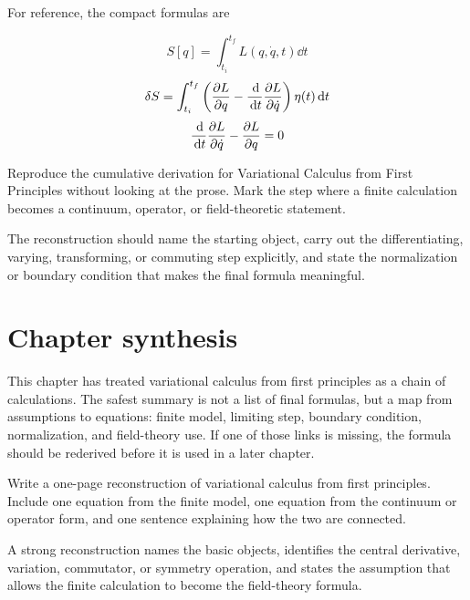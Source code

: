 For reference, the compact formulas are

\[
  S[q]=\int_{t_i}^{t_f}L(q,\dot q,t)\dd t
\]
\[
  \delta S=\int_{t_i}^{t_f}\left(\frac{\partial L}{\partial q}-\frac{\,\mathrm d}{\,\mathrm d t}\frac{\partial L}{\partial\dot q}\right)\eta(t)\,\mathrm d t
\]
\[
  \frac{\,\mathrm d}{\,\mathrm d t}\frac{\partial L}{\partial\dot q}-\frac{\partial L}{\partial q}=0
\]

\begin{exercise}
Reproduce the cumulative derivation for Variational Calculus from First Principles without looking at the prose.  Mark the step where a finite calculation becomes a continuum, operator, or field-theoretic statement.
\begin{answer}
The reconstruction should name the starting object, carry out the differentiating, varying, transforming, or commuting step explicitly, and state the normalization or boundary condition that makes the final formula meaningful.
\end{answer}
\end{exercise}



\section{Chapter synthesis}

This chapter has treated variational calculus from first principles as a chain of calculations.  The safest summary is not a list of final formulas, but a map from assumptions to equations: finite model, limiting step, boundary condition, normalization, and field-theory use.  If one of those links is missing, the formula should be rederived before it is used in a later chapter.

\begin{exercise}
Write a one-page reconstruction of variational calculus from first principles.  Include one equation from the finite model, one equation from the continuum or operator form, and one sentence explaining how the two are connected.
\begin{answer}
A strong reconstruction names the basic objects, identifies the central derivative, variation, commutator, or symmetry operation, and states the assumption that allows the finite calculation to become the field-theory formula.
\end{answer}
\end{exercise}
